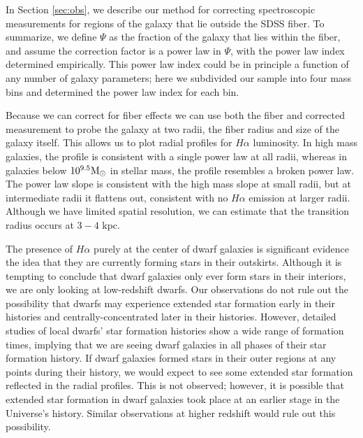 \documentclass[iop]{emulateapj}
\begin{document}
In Section \ref{sec:obs}, we describe our method for correcting spectroscopic measurements for regions of the galaxy that lie outside the SDSS fiber. To summarize, we define $\Psi$ as the fraction of the galaxy that lies within the fiber, and assume the correction factor is a power law in $\Psi$, with the power law index determined empirically. This power law index could be in principle a function of any number of galaxy parameters; here we subdivided our sample into four mass bins and determined the power law index for each bin.

Because we can correct for fiber effects we can use both the fiber and corrected measurement to probe the galaxy at two radii, the fiber radius and size of the galaxy itself. This allows us to plot radial profiles for $H\alpha$ luminosity. In high mass galaxies, the profile is consistent with a single power law at all radii, whereas in galaxies below $10^{9.5} \rm M_{\odot}$ in stellar mass, the profile resembles a broken power law. The power law slope is consistent with the high mass slope at small radii, but at intermediate radii it flattens out, consistent with no $H\alpha$ emission at larger radii. Although we have limited spatial resolution, we can estimate that the transition radius occurs at $3-4$ kpc.

The presence of $H\alpha$ purely at the center of dwarf galaxies is significant evidence the idea that they are currently forming stars in their outskirts. Although it is tempting to conclude that dwarf galaxies only ever form stars in their interiors, we are only looking at low-redshift dwarfs. Our observations do not rule out the possibility that dwarfs may experience extended star formation early in their histories and centrally-concentrated later in their histories. However, detailed studies of local dwarfs' star formation histories show a wide range of formation times, implying that we are seeing dwarf galaxies in all phases of their star formation history. If dwarf galaxies formed stars in their outer regions at any points during their history, we would expect to see some extended star formation reflected in the radial profiles. This is not observed; however, it is possible that extended star formation in dwarf galaxies took place at an earlier stage in the Universe's history. Similar observations at higher redshift would rule out this possibility.
\end{document}
